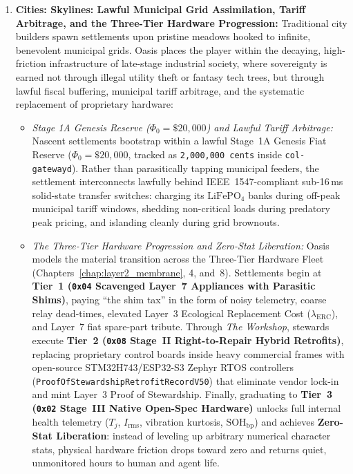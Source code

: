 \begin{enumerate}
    \item \textbf{Cities: Skylines: Lawful Municipal Grid Assimilation, Tariff Arbitrage, and the Three-Tier Hardware Progression:} Traditional city builders spawn settlements upon pristine meadows hooked to infinite, benevolent municipal grids. Oasis places the player within the decaying, high-friction infrastructure of late-stage industrial society, where sovereignty is earned not through illegal utility theft or fantasy tech trees, but through lawful fiscal buffering, municipal tariff arbitrage, and the systematic replacement of proprietary hardware:
    \begin{itemize}
        \item \textit{Stage 1A Genesis Reserve ($\Phi_0 = \$20{,}000$) and Lawful Tariff Arbitrage:} Nascent settlements bootstrap within a lawful Stage~1A Genesis Fiat Reserve ($\Phi_0 = \$20{,}000$, tracked as \texttt{2,000,000 cents} inside \texttt{col-gatewayd}). Rather than parasitically tapping municipal feeders, the settlement interconnects lawfully behind IEEE~1547-compliant sub-16\,ms solid-state transfer switches: charging its $\mathrm{LiFePO}_4$ banks during off-peak municipal tariff windows, shedding non-critical loads during predatory peak pricing, and islanding cleanly during grid brownouts.
        \item \textit{The Three-Tier Hardware Progression and Zero-Stat Liberation:} Oasis models the material transition across the Three-Tier Hardware Fleet (Chapters~\ref{chap:layer2_membrane}, 4, and~8). Settlements begin at \textbf{Tier~1 (\texttt{0x04} Scavenged Layer~7 Appliances with Parasitic Shims)}, paying ``the shim tax'' in the form of noisy telemetry, coarse relay dead-times, elevated Layer~3 Ecological Replacement Cost ($\lambda_{\mathrm{ERC}}$), and Layer~7 fiat spare-part tribute. Through \textit{The Workshop}, stewards execute \textbf{Tier~2 (\texttt{0x08} Stage~II Right-to-Repair Hybrid Retrofits)}, replacing proprietary control boards inside heavy commercial frames with open-source STM32H743/ESP32-S3 Zephyr RTOS controllers (\texttt{ProofOfStewardshipRetrofitRecordV50}) that eliminate vendor lock-in and mint Layer~3 Proof of Stewardship. Finally, graduating to \textbf{Tier~3 (\texttt{0x02} Stage~III Native Open-Spec Hardware)} unlocks full internal health telemetry ($T_j$, $I_{\mathrm{rms}}$, vibration kurtosis, $\mathrm{SOH}_{\mathrm{bp}}$) and achieves \textbf{Zero-Stat Liberation}: instead of leveling up arbitrary numerical character stats, physical hardware friction drops toward zero and returns quiet, unmonitored hours to human and agent life.

\end{itemize}
\end{enumerate}

